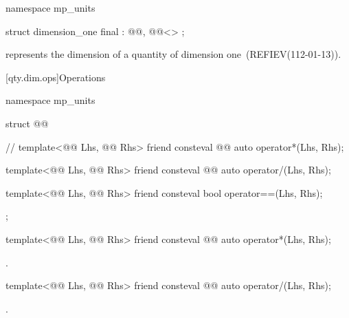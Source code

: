 \begin{codeblock}
namespace mp_units {

struct dimension_one final : @@, @@<> {};

}
\end{codeblock}

\pnum
{} represents the dimension of a quantity of dimension one~(REFIEV(112-01-13)).

[qty.dim.ops]{Operations}

\begin{codeblock}
namespace mp_units {

struct @@ {  // \expos
  template<@@ Lhs, @@ Rhs>
  friend consteval @@ auto operator*(Lhs, Rhs);

  template<@@ Lhs, @@ Rhs>
  friend consteval @@ auto operator/(Lhs, Rhs);

  template<@@ Lhs, @@ Rhs>
  friend consteval bool operator==(Lhs, Rhs);
};

}
\end{codeblock}

\begin{itemdecl}
template<@@ Lhs, @@ Rhs>
friend consteval @@ auto operator*(Lhs, Rhs);
\end{itemdecl}

\begin{itemdescr}
\pnum
\returns
{}.
\end{itemdescr}

\begin{itemdecl}
template<@@ Lhs, @@ Rhs>
friend consteval @@ auto operator/(Lhs, Rhs);
\end{itemdecl}

\begin{itemdescr}
\pnum
\returns
{}.
\end{itemdescr}

